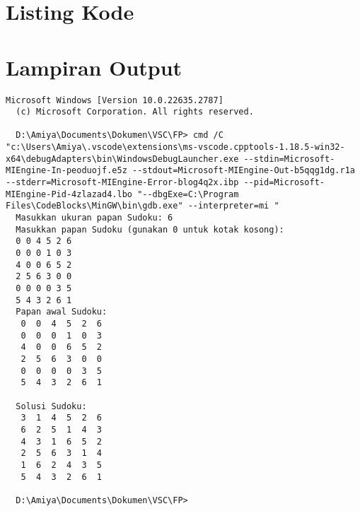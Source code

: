 \documentclass{article}
\begin{document}


\setcounter{page}{1}

\section{Listing Kode}

\clearpage

\section{Lampiran Output}
\begin{lstlisting}[style=outputstyle]
  Microsoft Windows [Version 10.0.22635.2787]
  (c) Microsoft Corporation. All rights reserved.
  
  D:\Amiya\Documents\Dokumen\VSC\FP> cmd /C "c:\Users\Amiya\.vscode\extensions\ms-vscode.cpptools-1.18.5-win32-x64\debugAdapters\bin\WindowsDebugLauncher.exe --stdin=Microsoft-MIEngine-In-peoduojf.e5z --stdout=Microsoft-MIEngine-Out-b5qqg1dg.r1a --stderr=Microsoft-MIEngine-Error-blog4q2x.ibp --pid=Microsoft-MIEngine-Pid-4zlazad4.lbo "--dbgExe=C:\Program Files\CodeBlocks\MinGW\bin\gdb.exe" --interpreter=mi "
  Masukkan ukuran papan Sudoku: 6
  Masukkan papan Sudoku (gunakan 0 untuk kotak kosong):
  0 0 4 5 2 6
  0 0 0 1 0 3
  4 0 0 6 5 2
  2 5 6 3 0 0
  0 0 0 0 3 5
  5 4 3 2 6 1
  Papan awal Sudoku:
   0  0  4  5  2  6
   0  0  0  1  0  3
   4  0  0  6  5  2
   2  5  6  3  0  0
   0  0  0  0  3  5
   5  4  3  2  6  1
  
  Solusi Sudoku:
   3  1  4  5  2  6
   6  2  5  1  4  3
   4  3  1  6  5  2
   2  5  6  3  1  4
   1  6  2  4  3  5
   5  4  3  2  6  1
  
  D:\Amiya\Documents\Dokumen\VSC\FP>
\end{lstlisting}
\clearpage

\end{document}
